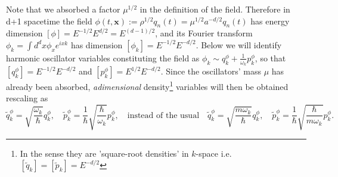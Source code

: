 \documentclass[../QFT_main.tex]{subfiles}
\begin{document}
\begin{mytheorem}
Note that we absorbed a factor $\mu^{1/2}$ in the definition of the field.
Therefore in d+1 spacetime the field $\phi(t,\mathbf{x}) := \rho^{1/2} q_n(t)= \mu^{1/2}a^{-d/2} q_n(t)$ has energy dimension $[\phi] = E^{-1/2} E^{d/2} = E^{(d-1)/2}$, and its Fourier transform $\phi_k= \int d^dx \phi_x e^{ixk}$ has dimension $[\phi_k] = E^{-1/2} E^{-d/2}$.
Below we will identify harmonic oscillator variables constituting the field as $\phi_k\sim q^\phi_k+\tfrac{1}{\omega_k} p^\phi_k$, so that $[q^\phi_k] = E^{-1/2} E^{-d/2}$ and $[p^\phi_k] = E^{1/2} E^{-d/2}$.
Since the oscillators' mass $\mu$ has already been absorbed, \emph{adimensional} density\footnote{In the sense they are 'square-root densities' in $k$-space i.e. $[\tilde{q}_k]=[\tilde{p}_k]=E^{-d/2}$} variables will then be obtained rescaling as
\begin{equation}
    \tilde{q}^\phi_k = \sqrt{\frac{\omega_k}{\hbar}} q^\phi_k, \quad \tilde{p}^\phi_k = \frac{1}{\hbar}\sqrt{\frac{\hbar}{\omega_k}} p^\phi_k,\quad
    \text{instead of the usual}\quad \tilde{q}^\phi_k = \sqrt{\frac{m\omega_k}{\hbar}} q^\phi_k,\quad \tilde{p}^\phi_k = \frac{1}{\hbar}\sqrt{\frac{\hbar}{m\omega_k}} p^\phi_k.
\end{equation}
%
\end{mytheorem}
\end{document}
